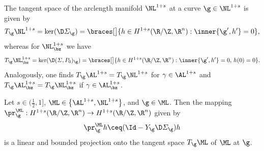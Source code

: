 The tangent space of the arclength manifold $\NL^{1+s}$ at a curve $\g\in
\NL^{1+s}$
is given by
\begin{equation}\label{eq:tangent-space-AL}
	T_\g\NL^{1+s} 
	=
	\ker (\D\varSigma_\g)
	=
	\braces[\big]{ 
		h\in H^{1+s}(\R/\Z,\R^n) : \inner{\g',h'}=0
	},
\end{equation}
whereas for $\NL_\bz^{1+s}$ we have
\begin{equation}\label{eq:tangent-space-ALz}
	T_\g\NL^{1+s}_\bz 
	=
	\ker(\D(\varSigma,P_0)_\g)
	=
	\braces[\big]{ 
		h\in H^{1+s}(\R/\Z,\R^n) : \inner{\g',h'}=0,\,h(0)=0
	}.
\end{equation}
Analogously, one finds $ T_{\g}\AL^{1+s}=T_\g\NL^{1+s} $ for $ \gamma\in \AL^{1+s} $ and $ T_\g\AL^{1+s}_{\bz}=T_\g\NL^{1+s}_{\bz} $ if $ \gamma\in\AL^{1+s}_{\bz} $. 
\begin{proposition}
\label{prop:projection-ALs}
Let $s\in (\frac{1}{2},1]$, $ \ML\in \left\{\AL^{1+s},\NL^{1+s}\right\}$, and $\g\in\ML$. Then the mapping
$\pr_\g^{\ML}:H^{1+s}(\R/\Z,\R^n)\to H^{1+s}(\R/\Z,\R^n)$ given by
\begin{equation}\label{eq:projection-ALs}
\pr_\g^{\ML}h\ceq(\Id-Y_\g \D\varSigma_\g)h
\end{equation}
is a linear and bounded projection onto the tangent space $T_\g\ML$
of $\ML$ at $\g$.
\end{proposition}
